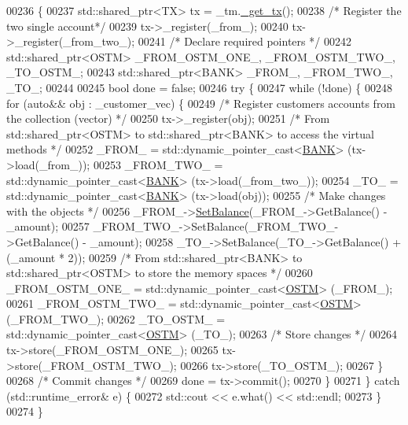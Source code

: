 \begin{DoxyCode}
00236                                                                                                            
                                                      \{
00237     std::shared\_ptr<TX> tx = \_tm.\hyperlink{class_t_m_a41cb0226cc4080c931651b13f74a0075_a41cb0226cc4080c931651b13f74a0075}{\_get\_tx}();
00238     \textcolor{comment}{/* Register the two single account*/}
00239     tx->\_register(\_from\_);
00240     tx->\_register(\_from\_two\_);
00241     \textcolor{comment}{/* Declare required pointers */}
00242     std::shared\_ptr<OSTM> \_FROM\_OSTM\_ONE\_, \_FROM\_OSTM\_TWO\_, \_TO\_OSTM\_;
00243     std::shared\_ptr<BANK> \_FROM\_, \_FROM\_TWO\_, \_TO\_;
00244 
00245     \textcolor{keywordtype}{bool} done = \textcolor{keyword}{false};
00246     \textcolor{keywordflow}{try} \{
00247         \textcolor{keywordflow}{while} (!done) \{
00248             \textcolor{keywordflow}{for} (\textcolor{keyword}{auto}&& obj : \_customer\_vec) \{
00249                 \textcolor{comment}{/* Register customers accounts from the collection (vector) */}
00250                 tx->\_register(obj);
00251                 \textcolor{comment}{/* From std::shared\_ptr<OSTM> to std::shared\_ptr<BANK> to access the virtual methods  */}
00252                 \_FROM\_ = std::dynamic\_pointer\_cast<\hyperlink{class_b_a_n_k}{BANK}> (tx->load(\_from\_));
00253                 \_FROM\_TWO\_ = std::dynamic\_pointer\_cast<\hyperlink{class_b_a_n_k}{BANK}> (tx->load(\_from\_two\_));
00254                 \_TO\_ = std::dynamic\_pointer\_cast<\hyperlink{class_b_a_n_k}{BANK}> (tx->load(obj));
00255                 \textcolor{comment}{/* Make changes with the objects */}
00256                 \_FROM\_->\hyperlink{class_b_a_n_k_ae3e45b407bf8ec7175662442ea24b7c0_ae3e45b407bf8ec7175662442ea24b7c0}{SetBalance}(\_FROM\_->GetBalance() - \_amount);
00257                 \_FROM\_TWO\_->SetBalance(\_FROM\_TWO\_->GetBalance() - \_amount);
00258                 \_TO\_->SetBalance(\_TO\_->GetBalance() + (\_amount * 2));
00259                 \textcolor{comment}{/* From std::shared\_ptr<BANK> to std::shared\_ptr<OSTM> to store the memory spaces */}
00260                 \_FROM\_OSTM\_ONE\_ = std::dynamic\_pointer\_cast<\hyperlink{class_o_s_t_m}{OSTM}> (\_FROM\_);
00261                 \_FROM\_OSTM\_TWO\_ = std::dynamic\_pointer\_cast<\hyperlink{class_o_s_t_m}{OSTM}> (\_FROM\_TWO\_);
00262                 \_TO\_OSTM\_ = std::dynamic\_pointer\_cast<\hyperlink{class_o_s_t_m}{OSTM}> (\_TO\_);
00263                 \textcolor{comment}{/* Store changes */}
00264                 tx->store(\_FROM\_OSTM\_ONE\_);
00265                 tx->store(\_FROM\_OSTM\_TWO\_);
00266                 tx->store(\_TO\_OSTM\_);
00267             \}
00268             \textcolor{comment}{/* Commit changes */}
00269             done = tx->commit();
00270         \}
00271     \} \textcolor{keywordflow}{catch} (std::runtime\_error& e) \{
00272         std::cout << e.what() << std::endl;
00273     \}
00274 \}
\end{DoxyCode}


